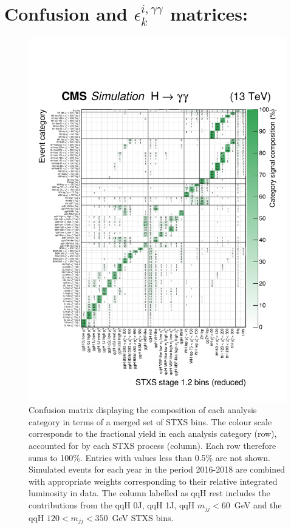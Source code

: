 \chapter{Confusion and $\epsilon^{i,\gamma\gamma}_k$ matrices: \Hgg}\label{app:eff_acc}

\begin{figure}[hptb]
  \centering
  \includegraphics[width=1\textwidth]{Figures/app_matrices/purityMatrix_thesis.pdf}
  \caption[Confusion matrix for the full set of analysis categories]
  {
    Confusion matrix displaying the composition of each analysis category in terms of a merged set of STXS bins. The colour scale corresponds to the fractional yield in each analysis category (row), accounted for by each STXS process (column). Each row therefore sums to 100\%. Entries with values less than 0.5\% are not shown. Simulated events for each year in the period 2016-2018 are combined with appropriate weights corresponding to their relative integrated luminosity in data. The column labelled as qqH rest includes the contributions from the qqH 0J, qqH 1J, qqH $m_{jj}<60$~GeV and the qqH $120<m_{jj}<350$~GeV STXS bins.
  }
  \label{fig:purity_matrix_full}
\end{figure}

